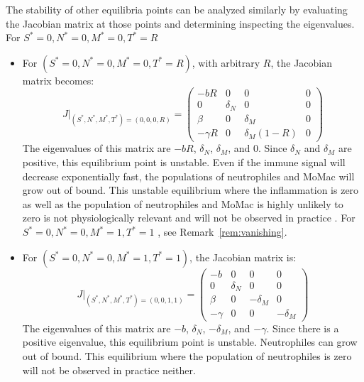 \documentclass[a4paper, 12pt]{article}
\providecommand{\DIFaddtex}[1]{{\protect\color{blue} \sf #1}} %
\providecommand{\DIFdeltex}[1]{{\protect\color{red} \scriptsize #1}} %
\providecommand{\DIFaddbegin}{} %
\providecommand{\DIFaddend}{} %
\providecommand{\DIFdelbegin}{} %
\providecommand{\DIFdelend}{} %
\providecommand{\DIFadd}[1]{\texorpdfstring{\DIFaddtex{#1}}{#1}} %
\providecommand{\DIFdel}[1]{\texorpdfstring{\DIFdeltex{#1}}{}} %
\begin{document}
The stability of other equilibria points can be analyzed similarly by evaluating the Jacobian matrix at those points and \DIFdelbegin \DIFdel{determining }\DIFdelend \DIFaddbegin \DIFadd{inspecting }\DIFaddend the eigenvalues.
\DIFdelbegin %
\DIFdel{For $S^* = 0, N^* = 0, M^* = 0, T^* = R$}\DIFdelend \DIFaddbegin \begin{itemize}
\item \DIFadd{For $(S^* = 0, N^* = 0, M^* = 0, T^* = R)$}\DIFaddend , with arbitrary $R$, the Jacobian matrix becomes:
\[
J|_{(S^*, N^*, M^*, T^*) = (0, 0, 0, R)} =
\begin{pmatrix}
- b R & 0 & 0 & 0 \\
0 & \delta_N & 0 & 0 \\
\beta & 0 & \delta_M & 0 \\
-\gamma R & 0 & \delta_M (1 - R) & 0
\end{pmatrix}
\]
The eigenvalues of this matrix are $-b R$, $\delta_N$, $\delta_M$, and $0$. Since $\delta_N$ and $\delta_M$ are positive, this equilibrium point is unstable. Even if the immune signal will decrease exponentially fast, the populations of neutrophiles and MoMac will grow out of bound. This unstable equilibrium where the \DIFdelbegin \DIFdel{inflammation is zero as well as the }\DIFdelend population of neutrophiles and MoMac is \DIFdelbegin \DIFdel{highly unlikely to }\DIFdelend \DIFaddbegin \DIFadd{zero is  not physiologically relevant and will not }\DIFaddend be observed in practice\DIFdelbegin \DIFdel{.
}%
\DIFdel{For $S^* = 0, N^* = 0, M^* = 1, T^* = 1$}\DIFdelend \DIFaddbegin \DIFadd{, see Remark~\ref{rem:vanishing}.
}\item \DIFadd{For $(S^* = 0, N^* = 0, M^* = 1, T^* = 1)$}\DIFaddend , the Jacobian matrix is:
\[
J|_{(S^*, N^*, M^*, T^*) = (0, 0, 1, 1)} =
\begin{pmatrix}
-b & 0 & 0 & 0 \\
0 & \delta_N & 0 & 0 \\
\beta & 0 & -\delta_M & 0 \\
-\gamma & 0 & 0 & -\delta_M
\end{pmatrix}
\]
The eigenvalues of this matrix are $-b$, $\delta_N$, $-\delta_M$, and $-\gamma$. Since there is a positive eigenvalue, this equilibrium point is unstable. Neutrophiles can grow out of bound. This equilibrium \DIFaddbegin \DIFadd{where the population of neutrophiles is zero }\DIFaddend will not be observed in practice \DIFdelbegin \DIFdel{neither.
}
\end{itemize}
\end{document}
